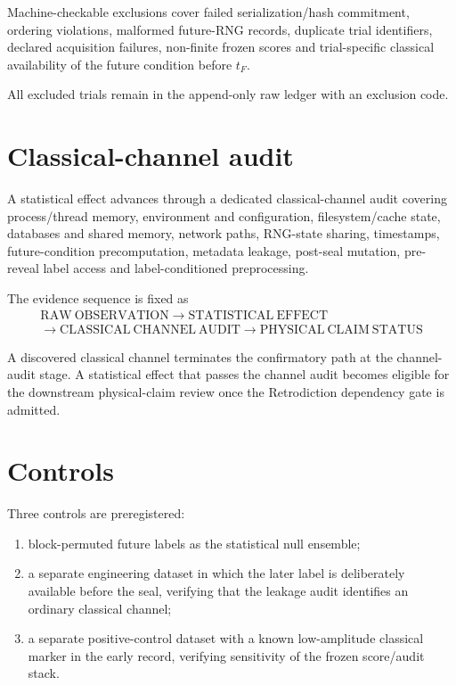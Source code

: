 Machine-checkable exclusions cover failed serialization/hash commitment, ordering violations, malformed future-RNG records, duplicate trial identifiers, declared acquisition failures, non-finite frozen scores and trial-specific classical availability of the future condition before $t_F$.

All excluded trials remain in the append-only raw ledger with an exclusion code.

\section{Classical-channel audit}

A statistical effect advances through a dedicated classical-channel audit covering process/thread memory, environment and configuration, filesystem/cache state, databases and shared memory, network paths, RNG-state sharing, timestamps, future-condition precomputation, metadata leakage, post-seal mutation, pre-reveal label access and label-conditioned preprocessing.

The evidence sequence is fixed as
\[
\boxed{
\begin{gathered}
\mathrm{RAW\ OBSERVATION}\to\mathrm{STATISTICAL\ EFFECT}\\[-1mm]
{}\to\mathrm{CLASSICAL\ CHANNEL\ AUDIT}\to\mathrm{PHYSICAL\ CLAIM\ STATUS}
\end{gathered}
}
\]

A discovered classical channel terminates the confirmatory path at the channel-audit stage. A statistical effect that passes the channel audit becomes eligible for the downstream physical-claim review once the Retrodiction dependency gate is admitted.

\section{Controls}

Three controls are preregistered:

\begin{enumerate}
\item block-permuted future labels as the statistical null ensemble;
\item a separate engineering dataset in which the later label is deliberately available before the seal, verifying that the leakage audit identifies an ordinary classical channel;
\item a separate positive-control dataset with a known low-amplitude classical marker in the early record, verifying sensitivity of the frozen score/audit stack.
\end{enumerate}

